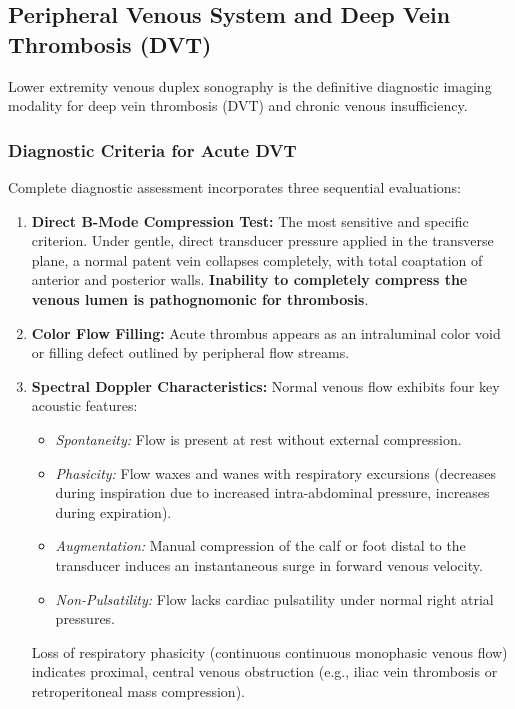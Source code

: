 \documentclass[11pt,a4paper]{article}
\begin{document}
\subsection{Peripheral Venous System and Deep Vein Thrombosis (DVT)}

Lower extremity venous duplex sonography is the definitive diagnostic imaging modality for deep vein thrombosis (DVT) and chronic venous insufficiency.

\subsubsection{Diagnostic Criteria for Acute DVT}
Complete diagnostic assessment incorporates three sequential evaluations:
\begin{enumerate}[leftmargin=*]
    \item \textbf{Direct B-Mode Compression Test:} The most sensitive and specific criterion. Under gentle, direct transducer pressure applied in the transverse plane, a normal patent vein collapses completely, with total coaptation of anterior and posterior walls. \textbf{Inability to completely compress the venous lumen is pathognomonic for thrombosis}.
    \item \textbf{Color Flow Filling:} Acute thrombus appears as an intraluminal color void or filling defect outlined by peripheral flow streams.
    \item \textbf{Spectral Doppler Characteristics:} Normal venous flow exhibits four key acoustic features:
    \begin{itemize}
        \item \textit{Spontaneity:} Flow is present at rest without external compression.
        \item \textit{Phasicity:} Flow waxes and wanes with respiratory excursions (decreases during inspiration due to increased intra-abdominal pressure, increases during expiration).
        \item \textit{Augmentation:} Manual compression of the calf or foot distal to the transducer induces an instantaneous surge in forward venous velocity.
        \item \textit{Non-Pulsatility:} Flow lacks cardiac pulsatility under normal right atrial pressures.
    \end{itemize}
    Loss of respiratory phasicity (continuous continuous monophasic venous flow) indicates proximal, central venous obstruction (e.g., iliac vein thrombosis or retroperitoneal mass compression).
\end{enumerate}
\end{document}
